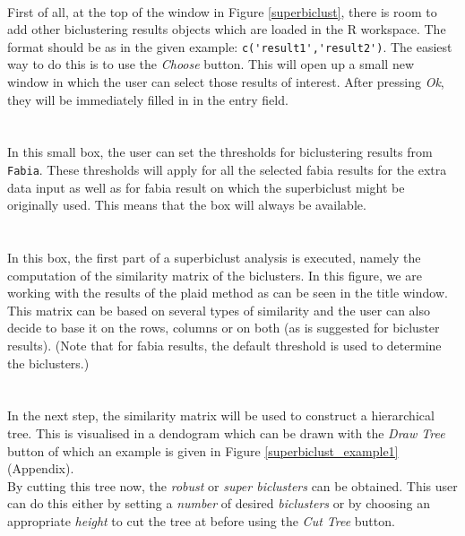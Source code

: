 \documentclass[a4paper]{article}\usepackage[]{graphicx}\usepackage[]{color}
\begin{document}
\\
\noindent First of all, at the top of the window in Figure \ref{superbiclust},
there is room to add other biclustering results objects which are loaded in the
R workspace. The format should be as in the given example:
\verb|c('result1','result2')|. The easiest way to do this is to use the {\it
Choose} button. This will open up a small new window in which the user can
select those results of interest. After pressing {\it Ok}, they will be
immediately filled in in the entry field.
\\ \\
\\
\noindent In this small box, the user can set the thresholds for biclustering
results from \verb|Fabia|. These thresholds will apply for all the selected
fabia results for the extra data input as well as for fabia result on which the
superbiclust might be originally used. This means that the box will always be
available.
\\ \\
\\
In this box, the first part of a superbiclust analysis is executed, namely the
computation of the similarity matrix of the biclusters. In this figure, we are
working with the results of the plaid method as can be seen in the title window.
This matrix can be based on several types of similarity and the user can
also decide to base it on the rows, columns or on both (as is suggested for bicluster
results). (Note that for fabia results, the default threshold is used to determine the biclusters.)
\\ \\
\\
In the next step, the similarity matrix will be used to construct a hierarchical
tree. This is visualised in a dendogram which can be drawn with the {\it Draw
Tree} button of which an example is given in Figure \ref{superbiclust_example1} 
(Appendix).\\
By cutting this tree now, the {\it robust} or {\it super biclusters} can be
obtained. This user can do this either by setting a {\it number} of desired
{\it biclusters} or by choosing an appropriate {\it height} to cut the tree at
before using the {\it Cut Tree} button.
\\ \\
\\
\end{document}
